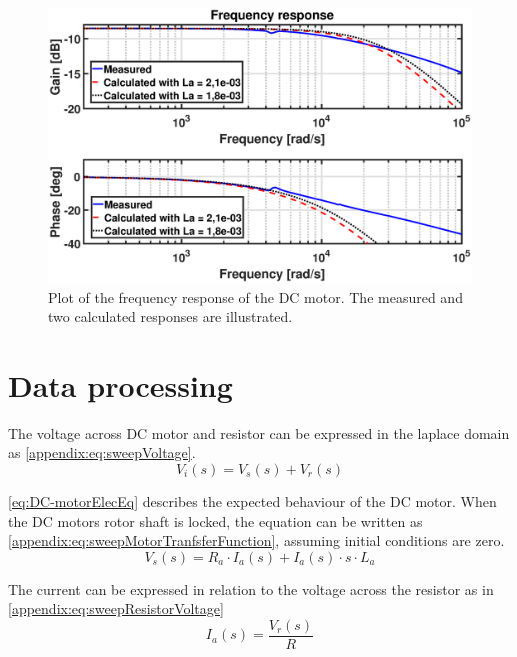 \begin{figure}
	\includegraphics[width = \textwidth]{figures/test/DCFrequencySweepRaw.eps}
	\caption{Plot of the frequency response of the DC motor. The measured and two calculated responses are illustrated.}
	\label{fig:DCFrequencySweepRawData}
\end{figure}

\section*{Data processing}
The voltage across DC motor and resistor can be expressed in the laplace domain as \autoref{appendix:eq:sweepVoltage}.
\begin{equation} 
V_{i}(s) = V_{s}(s) + V_r(s) \label{appendix:eq:sweepVoltage}
\end{equation}
\startexplain
{}
\stopexplain

\autoref{eq:DC-motorElecEq} describes the expected behaviour of the DC motor. When the DC motors rotor shaft is locked, the equation can be written as \autoref{appendix:eq:sweepMotorTranfsferFunction}, assuming initial conditions are zero.
\begin{equation} 
V_{s}(s) = R_{a}\cdot I_a(s) + I_a(s)\cdot s\cdot L_a \label{appendix:eq:sweepMotorTranfsferFunction}
\end{equation}

The current can be expressed in relation to the voltage across the resistor as in \autoref{appendix:eq:sweepResistorVoltage}
\begin{equation} 
I_{a}(s) = \frac{V_r(s)}{R} \label{appendix:eq:sweepResistorVoltage}
\end{equation}


